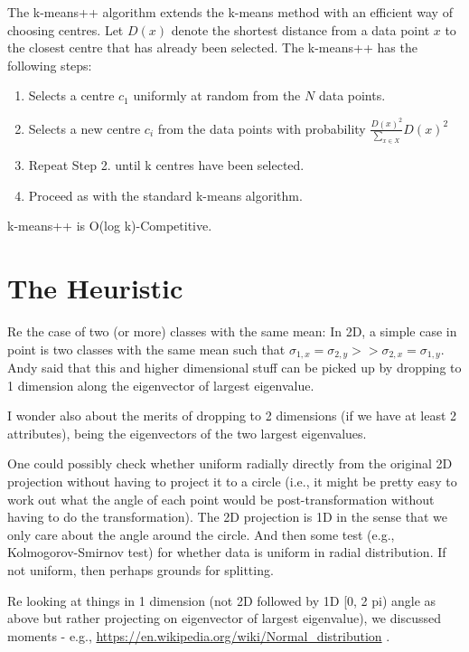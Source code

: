\documentclass{elsarticle}
\begin{document}
The k-means++ algorithm extends the k-means method with an efficient way of choosing centres. Let $D(x)$ denote the shortest distance from a data point $x$ to the closest centre that has already been selected. The k-means++ has the following steps:

\begin{enumerate}
	\item Selects a centre $c_1$ uniformly at random from the $N$ data points.
	\item Selects a new centre $c_i$ from the data points with probability $\frac{D(x)^2}{\sum_{x\in X}}D(x)^2$
	\item Repeat Step 2. until k centres have been selected.
	\item Proceed as with the standard k-means algorithm.
\end{enumerate}

k-means++ is O(log k)-Competitive.

\section{The Heuristic}

Re the case of two (or more) classes with the same mean:
In 2D, a simple case in point is two classes with the same mean
such that $\sigma_{1, x} = \sigma_{2, y} >> \sigma_{2, x} = \sigma_{1, y}$.
Andy said that this and higher dimensional stuff can be picked up
by dropping to 1 dimension along the eigenvector of largest eigenvalue.


I wonder also about the merits of dropping to 2 dimensions (if we have at least 2 attributes), being the eigenvectors of the two largest eigenvalues. 

One could possibly check whether uniform radially directly from the original 2D projection without having to project it to a circle (i.e., it might be pretty easy to work out what the angle of each point would be post-transformation without having to do the transformation).  The 2D projection is 1D in the sense that we only care about the angle around the circle.  And then some test (e.g., Kolmogorov-Smirnov test) for whether data is uniform in radial distribution.  If not uniform, then perhaps grounds for splitting.

Re looking at things in 1 dimension (not 2D followed by 1D [0, 2 pi) angle
as above but rather projecting on eigenvector of largest eigenvalue), we
discussed moments - e.g., \url{https://en.wikipedia.org/wiki/Normal_distribution} .
\end{document}

